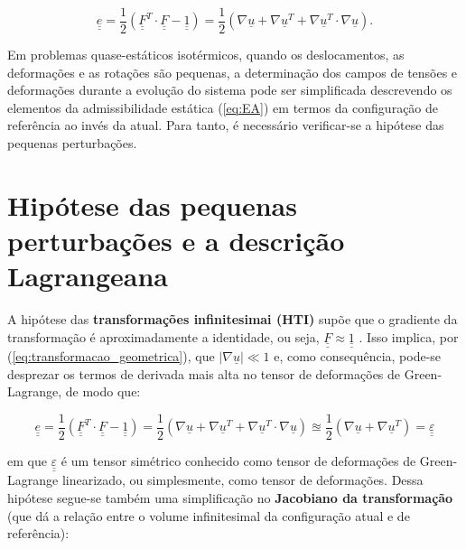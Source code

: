 \begin{equation}
	\label{eq:green_lagrange}
	\underline{\underline e} = \frac{1}{2} \left(\underline{\underline F}^T \cdot \underline{\underline F} - \underline{\underline 1}\right) = \frac{1}{2} \left(\nabla \underline u + \nabla\underline u^T + \nabla\underline u^T \cdot \nabla \underline u \right).
\end{equation}

Em problemas quase-estáticos isotérmicos, quando os deslocamentos, as deformações e as rotações são pequenas, a determinação dos campos de tensões e deformações durante a evolução do sistema pode ser simplificada descrevendo os elementos da admissibilidade estática (\ref{eq:EA}) em termos da configuração de referência ao invés da atual. Para tanto, é necessário verificar-se a hipótese das pequenas perturbações.



\section{Hipótese das pequenas perturbações e a descrição Lagrangeana}

A hipótese das \textbf{transformações infinitesimai (HTI)} supõe que o gradiente da transformação é aproximadamente a identidade, ou seja, $\underline{\underline F} \approx \underline{\underline 1}$ . Isso implica, por (\ref{eq:transformacao_geometrica}), que $\left| \nabla \underline u \right| \ll 1$ e, como consequência, pode-se desprezar os termos de derivada mais alta no tensor de deformações de Green-Lagrange, de modo que:

\begin{equation}
	\label{eq:green_lagrange_linearizado}
	\underline{\underline e} = \frac{1}{2} \left(\underline{\underline F}^T \cdot \underline{\underline F} - \underline{\underline 1}\right) = \frac{1}{2} \left(\nabla \underline u + \nabla\underline u^T + \nabla\underline u^T \cdot \nabla \underline u \right) \approxeq \frac{1}{2} \left(\nabla \underline u + \nabla\underline u^T \right) =\underline{\underline \varepsilon}
\end{equation}

em que $\underline{\underline \varepsilon}$ é um tensor simétrico conhecido como tensor de deformações de Green-Lagrange linearizado, ou simplesmente, como tensor de deformações. Dessa hipótese segue-se também uma simplificação no \textbf{Jacobiano da transformação} (que dá a relação entre o volume infinitesimal da configuração atual e de referência):

